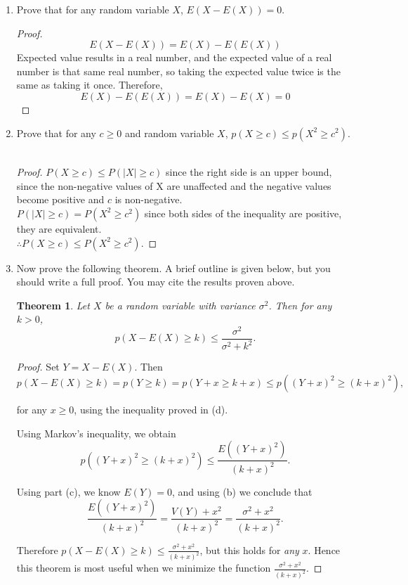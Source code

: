 \documentclass[12pt]{article}
\newtheorem{theorem}{Theorem}
\begin{document}
\begin{enumerate}
\begin{enumerate}
\item Prove that for any random variable $X$, $E(X-E(X)) = 0$. 
\begin{proof}
	\[E(X-E(X)) = E(X)-E(E(X))\]
	Expected value results in a real number, and the expected value of a real number is that same real number, so taking the expected value twice is the same as taking it once. Therefore,
	\[E(X)-E(E(X)) = E(X) - E(X) = 0\]
\end{proof}
\item Prove that for any $c \geq 0$ and random variable $X$, $p(X \geq c) \leq p(X^2 \geq c^2)$.\\\\
\begin{proof}
	$P(X \geq c) \leq P(|X|\geq c)$ since the right side is an upper bound, since the non-negative values of X are unaffected and the negative values become positive and $c$ is non-negative.\\
	$P(|X|\geq c) = P(X^2\geq c^2)$ since both sides of the inequality are positive, they are equivalent.\\ $\therefore P(X \geq c) \leq P(X^2 \geq c^2)$.
\end{proof}

\item Now prove the following theorem. A brief outline is given below, but you should write a full proof. You may cite the results proven above.

\begin{theorem}Let $X$ be a random variable with variance $\sigma^2$. Then  for any $k >0$,
\[p(X-E(X) \geq k) \leq \frac{\sigma^2}{\sigma^2 + k^2}.\]
\end{theorem}

\begin{proof} Set $Y = X - E(X)$.  Then \[p(X-E(X) \geq k)=p(Y \geq k)=p(Y+x \geq k+x)\leq p((Y+x)^2 \geq (k+x)^2),\]

for any $x \geq 0$, using the inequality proved in (d).  

Using Markov's inequality, we obtain 
\[p((Y+x)^2 \geq (k+x)^2) \leq \frac{E((Y+x)^2)}{(k+x)^2}.\] 


Using part (c), we know $E(Y)=0$, and using (b) we conclude that \[\frac{E((Y+x)^2)}{(k+x)^2} = \frac{V(Y)+x^2}{(k+x)^2} = \frac{\sigma^2+x^2}{(k+x)^2}.\]

Therefore $p(X-E(X) \geq k) \leq \frac{\sigma^2+x^2}{(k+x)^2}$, but this holds for {\em any} $x$. Hence this theorem is most useful when we minimize the function $\frac{\sigma^2+x^2}{(k+x)^2}$.


\end{proof}
\end{enumerate}
\end{enumerate}
\end{document}
